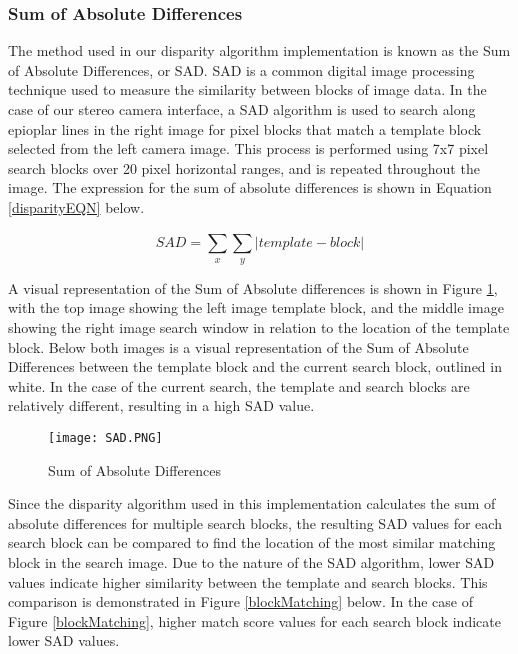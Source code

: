\subsubsection{Sum of Absolute Differences} \label{SADexample}
The method used in our disparity algorithm implementation is known as the Sum of Absolute Differences, or SAD. SAD is a common digital image processing technique used to measure the similarity between blocks of image data. In the case of our stereo camera interface, a SAD algorithm is used to search along epioplar lines in the right image for pixel blocks that match a template block selected from the left camera image. This process is performed using 7x7 pixel search blocks over 20 pixel horizontal ranges, and is repeated throughout the image. The expression for the sum of absolute differences is shown in Equation \ref{disparityEQN} below. 
\par
\begin{equation}\label{disparityEQN}
SAD = \sum_{x}^{}\sum_{y}^{}|template-block|
\end{equation}
\par
A visual representation of the Sum of Absolute differences is shown in Figure \ref{SAD}, with the top image showing the left image template block, and the middle image showing the right image search window in relation to the location of the template block. Below both images is a visual representation of the Sum of Absolute Differences between the template block and the current search block, outlined in white. In the case of the current search, the template and search blocks are relatively different, resulting in a high SAD value. 
\par
\begin{figure}[h]
	\centerline{\texttt{[image: SAD.PNG]}}
	\caption{Sum of Absolute Differences \cite{mccormick}}
	\label{SAD}
\end{figure}
\par
Since the disparity algorithm used in this implementation calculates the sum of absolute differences for multiple search blocks, the resulting SAD values for each search block can be compared to find the location of the most similar matching block in the search image. Due to the nature of the SAD algorithm, lower SAD values indicate higher similarity between the template and search blocks. This comparison is demonstrated in Figure \ref{blockMatching} below. In the case of Figure 
\ref{blockMatching}, higher match score values for each search block indicate lower SAD values.
